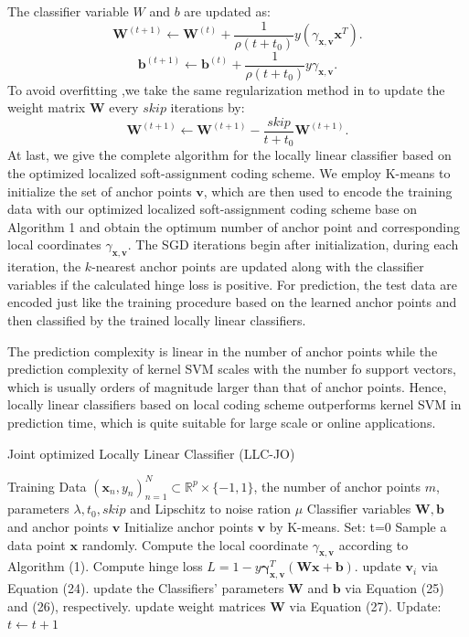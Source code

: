 \documentclass{llncs}
\def \x {\mathbf{x}}
\def \W {\mathbf{W}}
\def \v {\mathbf{v}}
\def \b {\mathbf{b}}
\begin{document}
	The classifier variable $W$ and $b$ are updated as:
	\begin{equation}
	\W^{(t+1)} \leftarrow \W^{(t)} + \frac{1}{\rho(t+t_0)}y(\gamma_{\x,\v}\x^T).
	\end{equation}
	\begin{equation}
	\b^{(t+1)} \leftarrow \b^{(t)} + \frac{1}{\rho(t+t_0)}y\gamma_{\x,\v}.
	\end{equation}
	To avoid overfitting ,we take the same regularization method in \cite{13} to update the weight matrix $\W$ every $skip$ iterations by:
	\begin{equation}
	\W^{(t+1)} \leftarrow \W^{(t+1)} - \frac{skip}{t+t_0}\W^{(t+1)}.
	\end{equation} 
	At last, we give the complete algorithm for the locally linear classifier based on the optimized localized soft-assignment coding scheme. We employ K-means to initialize the set of anchor points $\v$, which are then used to encode the training data with our optimized localized soft-assignment coding scheme base on Algorithm 1 and obtain the optimum number of anchor point and corresponding local coordinates $\gamma_{\x,\v}$. The SGD iterations begin after initialization, during each iteration, the $k$-nearest anchor points are updated along with the classifier variables if the calculated hinge loss is positive. For prediction, the test data are encoded just like the training procedure based on the learned anchor points and then classified by the trained locally linear classifiers.
	
	The prediction complexity is linear in the number of anchor points while the prediction complexity of kernel SVM scales with the number fo support vectors, which is usually orders of magnitude larger than that of anchor points. Hence, locally linear classifiers based on local coding scheme outperforms kernel SVM in prediction time, which is quite suitable for large scale or online applications.
	\begin{algorithm}[H]
		\caption{Joint optimized Locally Linear Classifier (LLC-JO)}
		\begin{algorithmic}
			\REQUIRE Training Data ${(\x_n,y_n)}_{n=1}^N \subset \mathbb{R}^p \times \{-1,1\}$, the number of anchor points $m$, parameters $\lambda,t_0,skip$ and Lipschitz to noise ration $\mu$
			\ENSURE Classifier variables $\W, \b$ and anchor points $\v$
			\STATE Initialize anchor points $\v$ by K-means.
			\STATE Set: t=0
				\STATE Sample a data point $\x$ randomly.
				\STATE Compute the local coordinate $\gamma_{\x,\v}$ according to Algorithm (1).
				\STATE Compute hinge loss $L = 1-y\boldsymbol{\gamma}_{\x,\v}^T(\W\x + \b)$.
					\FOR {each nearest anchor point $\v_i$ to data point $\x$}
						\STATE update $\v_i$ via Equation (24).
						\STATE update the Classifiers' parameters $\W$ and $\b$ via Equation (25) and (26), respectively.
					\ENDFOR
				\ENDIF
					\STATE update weight matrices $\W$ via Equation (27).
				\ENDIF
				\STATE Update: $t\leftarrow t+1$
			\ENDWHILE
		\end{algorithmic}
	\end{algorithm}
\end{document}
